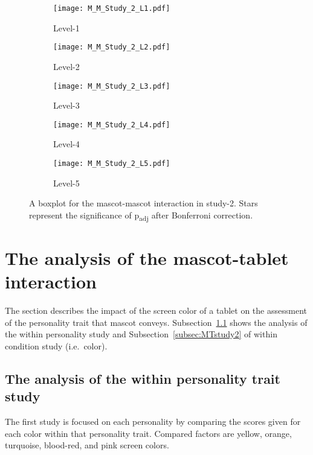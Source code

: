 \begin{figure}[hbt!]
    \centering
    \begin{subfigure}{.40\textwidth}
        \centering
        \texttt{[image: M\_M\_Study\_2\_L1.pdf]}
        \caption{Level-1}
        \label{fig:sub1}
    \end{subfigure}\hfill%
    \begin{subfigure}{.40\textwidth}
        \centering
        \texttt{[image: M\_M\_Study\_2\_L2.pdf]}
        \caption{Level-2}
        \label{fig:sub2}
    \end{subfigure}\hfill
    \begin{subfigure}{.40\textwidth}
        \centering
        \texttt{[image: M\_M\_Study\_2\_L3.pdf]}
        \caption{Level-3}
        \label{fig:sub1}
    \end{subfigure}\hfill%
    \begin{subfigure}{.40\textwidth}
        \centering
        \texttt{[image: M\_M\_Study\_2\_L4.pdf]}
        \caption{Level-4}
        \label{fig:sub1}
    \end{subfigure}\hfill%
    \begin{subfigure}{.40\textwidth}
        \centering
        \texttt{[image: M\_M\_Study\_2\_L5.pdf]}
        \caption{Level-5}
        \label{fig:sub1}
    \end{subfigure}\hfill%
    \caption{A boxplot for the mascot-mascot interaction in study-2.
    Stars represent the significance of p\textsubscript{adj} after Bonferroni correction.}
    \label{fig:MM2}
\end{figure}
\section{The analysis of the mascot-tablet interaction}
\label{sec:m-t}
The section describes the impact of the screen color of a tablet on the assessment of the
personality trait that mascot conveys.
Subsection~\ref{subsec:MTstudy1} shows the analysis of the within personality study
and Subsection~\ref{subsec:MTstudy2} of within condition study (i.e.\ color).

\subsection{The analysis of the within personality trait study}
\label{subsec:MTstudy1}
The first study is focused on each personality by comparing the scores given
for each color within that personality trait.
Compared factors are yellow, orange, turquoise, blood-red, and pink screen colors.

